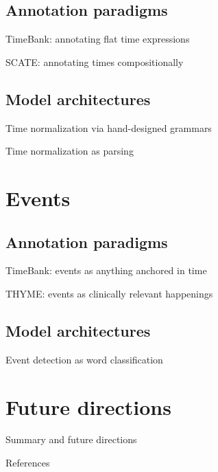 \documentclass[12pt,compress]{beamer}
\begin{document}
\subsection{Annotation paradigms}


\begin{frame}{TimeBank: annotating flat time expressions}
\end{frame}


\begin{frame}{SCATE: annotating times compositionally}
\end{frame}


\subsection{Model architectures}


\begin{frame}{Time normalization via hand-designed grammars}
\end{frame}


\begin{frame}{Time normalization as parsing}
\end{frame}


\section{Events}


\subsection{Annotation paradigms}


\begin{frame}{TimeBank: events as anything anchored in time}
\end{frame}


\begin{frame}{THYME: events as clinically relevant happenings}
\end{frame}




\subsection{Model architectures}

\begin{frame}{Event detection as word classification}
\end{frame}


\section{Future directions}


\begin{frame}{Summary and future directions}
\end{frame}


\begin{frame}[allowframebreaks]{References}
\printbibliography
\end{frame}
\end{document}
